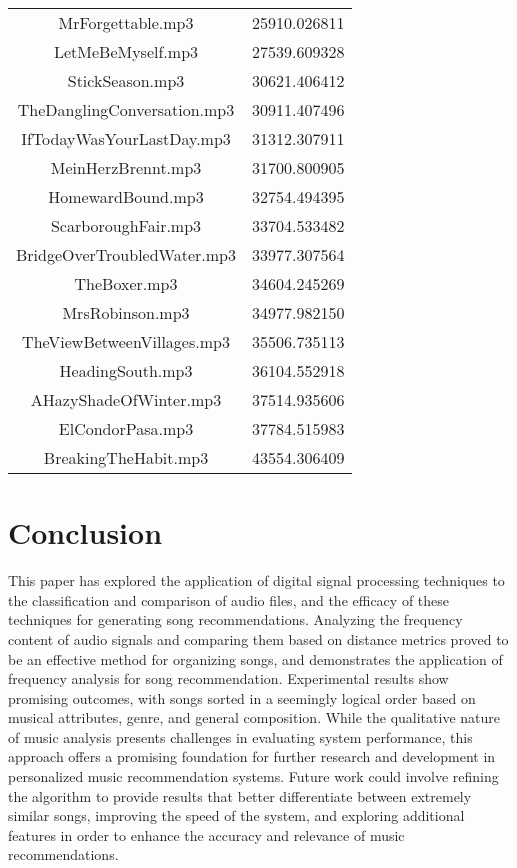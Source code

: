 \documentclass[conference]{IEEEtran}
\begin{document}
\begin{table}[htbp]
\begin{center}
\begin{tabular}{|c|c|}
      MrForgettable.mp3 & 25910.026811\\
      LetMeBeMyself.mp3 & 27539.609328\\
      StickSeason.mp3 & 30621.406412\\
      TheDanglingConversation.mp3 & 30911.407496\\
      IfTodayWasYourLastDay.mp3 & 31312.307911\\
      MeinHerzBrennt.mp3 & 31700.800905\\
      HomewardBound.mp3 & 32754.494395\\
      ScarboroughFair.mp3 & 33704.533482\\
      BridgeOverTroubledWater.mp3 & 33977.307564\\
      TheBoxer.mp3 & 34604.245269\\
      MrsRobinson.mp3 & 34977.982150\\
      TheViewBetweenVillages.mp3 & 35506.735113\\
      HeadingSouth.mp3 & 36104.552918\\
      AHazyShadeOfWinter.mp3 & 37514.935606\\
      ElCondorPasa.mp3 & 37784.515983\\
      BreakingTheHabit.mp3 & 43554.306409\\
      \hline
    \end{tabular}
  \end{center}
\end{table}

\section{Conclusion}
This paper has explored the application of digital signal processing techniques to the classification and comparison of audio files, and the efficacy of these techniques for generating song recommendations. Analyzing the frequency content of audio signals and comparing them based on distance metrics proved to be an effective method for organizing songs, and demonstrates the application of frequency analysis for song recommendation. Experimental results show promising outcomes, with songs sorted in a seemingly logical order based on musical attributes, genre, and general composition. While the qualitative nature of music analysis presents challenges in evaluating system performance, this approach offers a promising foundation for further research and development in personalized music recommendation systems. Future work could involve refining the algorithm to provide results that better differentiate between extremely similar songs, improving the speed of the system, and exploring additional features in order to enhance the accuracy and relevance of music recommendations.
\end{document}
